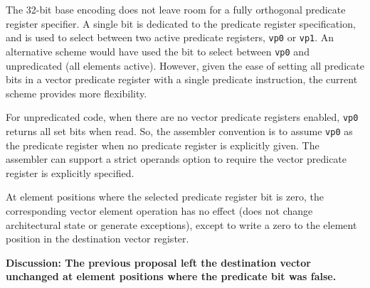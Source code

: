 \begin{commentary}
  The 32-bit base encoding does not leave room for a fully orthogonal
  predicate register specifier.  A single bit is dedicated to the
  predicate register specification, and is used to select between two
  active predicate registers, {\tt vp0} or {\tt vp1}. An alternative
  scheme would have used the bit to select between {\tt vp0} and
  unpredicated (all elements active).  However, given the ease of
  setting all predicate bits in a vector predicate register with a
  single predicate instruction, the current scheme provides more
  flexibility.

  For unpredicated code, when there are no vector predicate registers
  enabled, {\tt vp0} returns all set bits when read.  So, the
  assembler convention is to assume {\tt vp0} as the predicate
  register when no predicate register is explicitly given.  The
  assembler can support a strict operands option to require the vector
  predicate register is explicitly specified.
\end{commentary}

At element positions where the selected predicate register bit is
zero, the corresponding vector element operation has no effect (does
not change architectural state or generate exceptions), except to
write a zero to the element position in the destination vector
register.

\begin{commentary}
  {\bf Discussion: The previous proposal left the destination vector
    unchanged at element positions where the predicate bit was false.
    }
\end{commentary}








